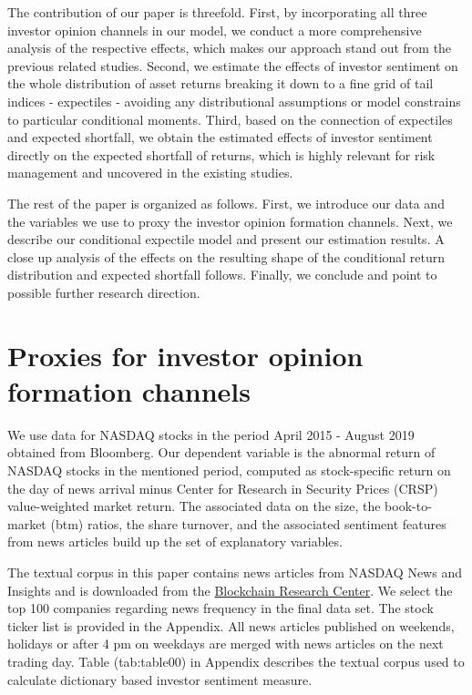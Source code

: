 \documentclass[]{article}
\begin{document}
The contribution of our paper is threefold. First, by incorporating all three investor opinion channels in our model, we  conduct a more comprehensive analysis of the respective effects, which makes our approach stand out from the previous related studies. Second, we estimate the effects of investor sentiment on the whole distribution of asset returns breaking it down to a fine grid of tail indices - expectiles - avoiding any distributional assumptions or model constrains to particular conditional moments. Third, based on the connection of expectiles and expected shortfall, we obtain the estimated effects of investor sentiment directly on the expected shortfall of returns, which is highly relevant for risk management and uncovered in the existing studies.

The rest of the paper is organized as follows. First, we introduce our data and the variables we use to proxy the investor opinion formation channels. Next, we describe our conditional expectile model and present our estimation results.  A close up analysis of the effects on the resulting shape of the conditional return distribution and expected shortfall follows. Finally, we conclude and point to possible further research direction.

\hypertarget{proxies-for-investor-opinion-channels}{%
\section{Proxies for investor opinion formation channels}\label{proxies-for-investor-opinion-channels}}

We use data for NASDAQ stocks in the period April 2015 - August 2019 obtained from Bloomberg.
Our dependent variable is the abnormal return of NASDAQ stocks in the mentioned period, computed as stock-specific return on the day of news arrival minus Center for Research in Security Prices (CRSP) value-weighted market return. The associated data on the size, the book-to-market (btm) ratios, the share turnover, and the associated sentiment features from news articles build up the set of explanatory variables.

The textual corpus in this paper contains news articles from NASDAQ News and Insights and is downloaded from the \href{https://blockchain-research-center.com/}{Blockchain Research Center}. We select the top 100 companies regarding news frequency in the final data set. The stock ticker list is provided in the Appendix. All news articles published on weekends, holidays or after 4 pm on weekdays are merged with news articles on the next trading day.
Table \@ref(tab:table00) in Appendix describes the textual corpus used to calculate dictionary based investor sentiment measure.
\end{document}
